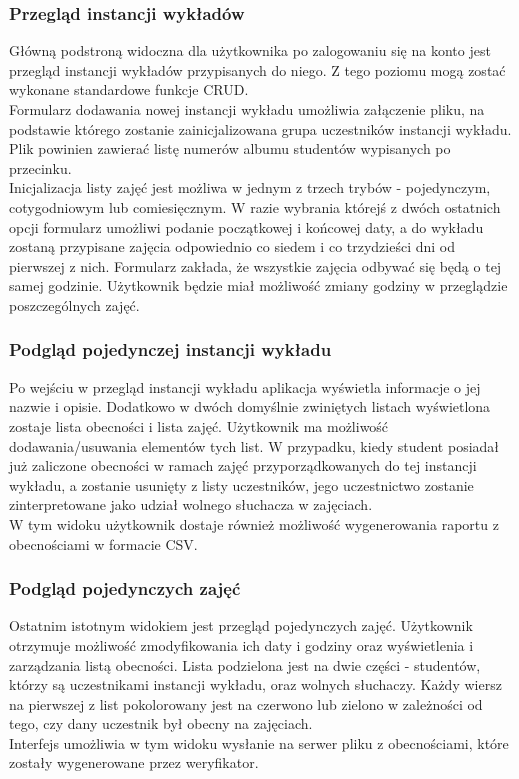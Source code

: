 \documentclass[declaration,shortabstract, mgr]{iithesis}
\begin{document}
\subsubsection{Przegląd instancji wykładów}
\indent Główną podstroną widoczna dla użytkownika po zalogowaniu się na konto jest przegląd instancji wykładów przypisanych do niego. Z tego poziomu mogą zostać wykonane standardowe funkcje CRUD\cite{crud}.\\
\indent Formularz dodawania nowej instancji wykładu umożliwia załączenie pliku, na podstawie którego zostanie zainicjalizowana grupa uczestników instancji wykładu. Plik powinien zawierać listę numerów albumu studentów wypisanych po przecinku.\\
\indent Inicjalizacja listy zajęć jest możliwa w jednym z trzech trybów - pojedynczym, cotygodniowym lub comiesięcznym. W razie wybrania którejś z dwóch ostatnich opcji formularz umożliwi podanie początkowej i końcowej daty, a do wykładu zostaną przypisane zajęcia odpowiednio co siedem i co trzydzieści dni od pierwszej z nich. Formularz zakłada, że wszystkie zajęcia odbywać się będą o tej samej godzinie. Użytkownik będzie miał możliwość zmiany godziny w przeglądzie poszczególnych zajęć.\\
\subsubsection{Podgląd pojedynczej instancji wykładu}
\indent Po wejściu w przegląd instancji wykładu aplikacja wyświetla informacje o jej nazwie i opisie. Dodatkowo w dwóch domyślnie zwiniętych listach wyświetlona zostaje lista obecności i lista zajęć. Użytkownik ma możliwość dodawania/usuwania elementów tych list. W przypadku, kiedy student posiadał już zaliczone obecności w ramach zajęć przyporządkowanych do tej instancji wykładu, a zostanie usunięty z listy uczestników, jego uczestnictwo zostanie zinterpretowane jako udział wolnego słuchacza w zajęciach.\\
\indent W tym widoku użytkownik dostaje również możliwość wygenerowania raportu z obecnościami w formacie CSV.\\
\subsubsection{Podgląd pojedynczych zajęć}
\indent Ostatnim istotnym widokiem jest przegląd pojedynczych zajęć. Użytkownik otrzymuje możliwość zmodyfikowania ich daty i godziny oraz wyświetlenia i zarządzania listą obecności. Lista podzielona jest na dwie części - studentów, którzy są uczestnikami instancji wykładu, oraz wolnych słuchaczy. Każdy wiersz na pierwszej z list pokolorowany jest na czerwono lub zielono w zależności od tego, czy dany uczestnik był obecny na zajęciach. \\
\indent Interfejs umożliwia w tym widoku wysłanie na serwer pliku z obecnościami, które zostały wygenerowane przez weryfikator.\\
\end{document}
